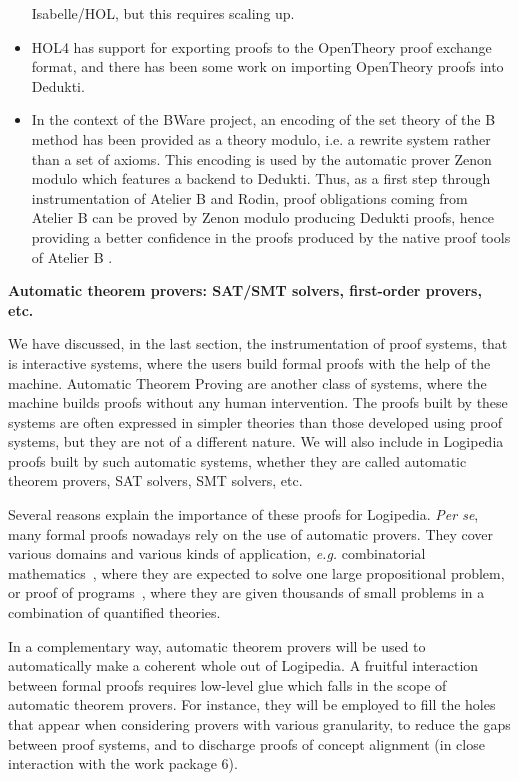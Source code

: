 \begin{itemize}
  Isabelle/HOL, but this requires scaling up.
  \item HOL4 has support for exporting proofs to the OpenTheory proof
  exchange format, and there has been some work on importing
  OpenTheory proofs into Dedukti.
  \item In the context of the BWare project, an encoding of the set
  theory of the B method has been provided as a theory modulo, i.e. a
  rewrite system rather than a set of axioms. This encoding is used by
  the automatic prover Zenon modulo which features a backend to
  Dedukti. Thus, as a first step through instrumentation of Atelier B
  and Rodin, proof obligations coming from Atelier B can be proved by
  Zenon modulo producing Dedukti proofs, hence providing a better
  confidence in the proofs produced by the native proof tools of
  Atelier B \cite{Bware}.
\end{itemize}

\bigskip
\noindent
{\bf \Large Automatic theorem provers: SAT/SMT solvers, first-order provers, etc.}

\medskip

We have discussed, in the last section, the instrumentation of proof
systems, that is interactive systems, where the users build formal
proofs with the help of the machine. Automatic Theorem Proving are
another class of systems, where the machine builds proofs without any
human intervention. The proofs built by these systems are often
expressed in simpler theories than those developed using proof
systems, but they are not of a different nature. We will also include
in Logipedia proofs built by such automatic systems, whether they are
called automatic theorem provers, SAT solvers, SMT solvers, etc.

Several reasons explain the importance of these proofs for Logipedia.
{\em Per se}, many formal proofs nowadays rely on the use of automatic
provers. They cover various domains and various kinds of application,
{\em e.g.} combinatorial
mathematics~\cite{DBLP:journals/ai/KonevL15,DBLP:conf/sat/HeuleKM16},
where they are expected to solve one large propositional problem, or
proof of
programs~\cite{DBLP:conf/esop/FilliatreP13,DBLP:journals/pacmpl/ProtzenkoZRRWBD17},
where they are given thousands of small problems in a combination of
quantified theories.

In a complementary way, automatic theorem provers will be used to automatically make a
coherent whole out of Logipedia. A fruitful interaction between
formal proofs requires low-level glue which falls in the scope of automatic theorem provers.
For instance, they will be employed to fill the holes that appear when
considering provers with various granularity, to reduce the gaps between
proof systems, and to discharge proofs of concept alignment (in close
interaction with the work package 6).

